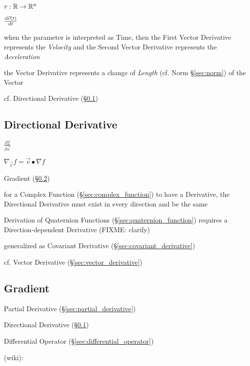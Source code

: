 $r : \mathbb{R} \rightarrow \mathbb{R}^n$

$\frac{\mathrm{d}\vec{r}(t)}{\mathrm{d}t}$

when the parameter is interpreted as Time, then the First Vector Derivative
represents the \emph{Velocity} and the Second Vector Derivative represents the
\emph{Acceleration}

the Vector Derivative represents a change of \emph{Length} (cf. Norm
\S\ref{sec:norm}) of the Vector

cf. Directional Derivative (\S\ref{sec:directional_derivative})



\subsection{Directional Derivative}\label{sec:directional_derivative}

$\frac{\partial{f}}{\partial{\vec{v}}}$

$\nabla_{\vec{v}} f = \vec{v}\bullet \nabla{f}$

Gradient (\S\ref{sec:gradient})

for a Complex Function (\S\ref{sec:complex_function}) to have a Derivative, the
Directional Derivative must exist in every direction and be the same

Derivation of Quaternion Functions (\S\ref{sec:quaternion_function}) requires a
Direction-dependent Derivative (FIXME: clarify)

\fist generalized as Covariant Derivative (\S\ref{sec:covariant_derivative})

cf. Vector Derivative (\S\ref{sec:vector_derivative})



\subsection{Gradient}\label{sec:gradient}

Partial Derivative (\S\ref{sec:partial_derivative})

Directional Derivative (\S\ref{sec:directional_derivative})

Differential Operator (\S\ref{sec:differential_operator})

(wiki):

